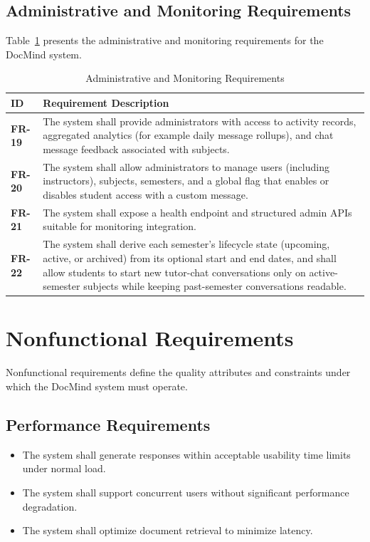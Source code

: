\documentclass[12pt, a4paper, oneside]{report}
\let\oldsection\section
\renewcommand{\section}{%
  \addtocontents{toc}{\protect\needspace{4\baselineskip}}%
  \oldsection
}
\let\oldsubsection\subsection
\renewcommand{\subsection}{%
  \addtocontents{toc}{\protect\needspace{3\baselineskip}}%
  \oldsubsection
}
\begin{document}
\subsection{Administrative and Monitoring Requirements}

Table~\ref{tab:fr_admin} presents the administrative and monitoring requirements for the DocMind system.

\begin{table}[H]
\centering
\caption{Administrative and Monitoring Requirements}
\label{tab:fr_admin}
\begin{tabular}{>{\bfseries}lp{10cm}}
\toprule
ID & Requirement Description \\
\midrule
FR-19 & The system shall provide administrators with access to activity records, aggregated analytics (for example daily message rollups), and chat message feedback associated with subjects. \\
FR-20 & The system shall allow administrators to manage users (including instructors), subjects, semesters, and a global flag that enables or disables student access with a custom message. \\
FR-21 & The system shall expose a health endpoint and structured admin APIs suitable for monitoring integration. \\
FR-22 & The system shall derive each semester's lifecycle state (upcoming, active, or archived) from its optional start and end dates, and shall allow students to start new tutor-chat conversations only on active-semester subjects while keeping past-semester conversations readable. \\
\bottomrule
\end{tabular}
\end{table}

\newpage

\section{Nonfunctional Requirements}

Nonfunctional requirements define the quality attributes and constraints under which the DocMind system must operate.

\subsection{Performance Requirements}

\begin{itemize}
  \item The system shall generate responses within acceptable usability time limits under normal load.
  \item The system shall support concurrent users without significant performance degradation.
  \item The system shall optimize document retrieval to minimize latency.
\end{itemize}
\end{document}
